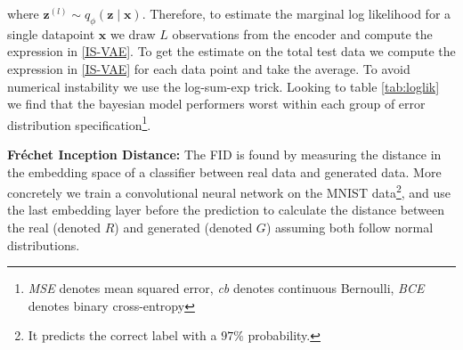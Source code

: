 \iffalse

\begin{align}
	\nonumber
	\log p_{\bm{\theta}}(\mathbf{x}) & = \log \int p_{\bm{\theta}}(\mathbf{x}, \mathbf{z})
	\frac{q_{\phi}(\mathbf{z} \mid \mathbf{x})}{q_{\phi}(\mathbf{z} \mid \mathbf{x})}
	d \mathbf{z}                                                                                        \\
	                                 & =
	\nonumber
	\log \mathbb{E}_{q_{\bm{\phi}}(\mathbf{z} \mid  \mathbf{x})} \left[
		\frac{
			p_{\bm{\theta}}(\mathbf{x}, \mathbf{z})
		}{q_{\phi}(\mathbf{z} \mid \mathbf{x})}
	\right]                                                                                             \\
	\label{IS-VAE}
	\Leftrightarrow
	\log p_{\bm{\theta}}(\mathbf{x}) & \approx
	\log \frac{1}{L} \sum_{l=1}^{L}
	\frac{
		p_{\bm{\theta}}(\mathbf{x} \mid  \mathbf{z}^{(l)}) p_{\bm{\theta}}(\mathbf{z})
	}{
		q_{\phi}(\mathbf{z}^{(l)} \mid \mathbf{x})
	}
\end{align}

\fi

where $\mathbf{z}^{(l)} \sim q_{\phi}(\mathbf{z} \mid \mathbf{x}) $. 
Therefore, to estimate the marginal log likelihood for a single datapoint $\mathbf{x}$
we draw $L$ observations from the encoder and compute the expression in \eqref{IS-VAE}.
To get the estimate on the total test data we compute the expression in \eqref{IS-VAE} 
for each data point and take the average. 
To avoid numerical instability we use the log-sum-exp trick. Looking to table \ref{tab:loglik} we find that the bayesian model performers worst within each group of error distribution specification\footnote{\textit{MSE} denotes mean squared error, \textit{cb} denotes continuous Bernoulli, \textit{BCE} denotes binary cross-entropy}.

\begin{table}[ht]
    \centering
    \caption{Marginal log likelihood}
    \label{tab:loglik}
\end{table}
\textbf{Fréchet Inception Distance:} The FID is found by measuring the distance in the embedding space of a classifier between real data and generated data. More concretely we train a convolutional neural network on the MNIST data\footnote{It predicts the correct label with a $97\%$ probability.}, and use the last embedding layer before the prediction to calculate the distance between the real (denoted $R$) and generated (denoted $G$) assuming both follow normal distributions. 

